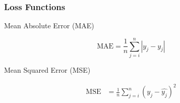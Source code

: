 \documentclass[]{beamer}
\begin{document}

\begin{frame}
\frametitle{Loss Functions}
Mean Absolute Error (MAE)

	\begin{equation}
	\text{MAE} = \frac{1}{n} \sum_{j = i}^{n} |y_j - \hat{y_j}|
	\end{equation}
	
Mean Squared Error (MSE)

	\begin{align}
	\text{MSE} &= \frac{1}{n} \sum_{j = i}^{n} \left( y_j - \hat{y_j}\right) ^2
	\end{align}
	

\end{frame}


\end{document}
